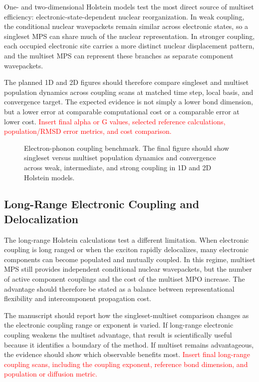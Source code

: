 \documentclass[journal=jctcce,manuscript=article]{achemso}
\newcommand{\placeholder}[1]{\textcolor{red}{#1}}
\newcommand{\figureplaceholder}[2]{%
\begin{figure}[htbp]
    \centering
    \fbox{%
    \begin{minipage}[c][0.24\textheight][c]{0.82\textwidth}
        \centering
        \textbf{Figure dummy: #1}\\[0.5em]
        \placeholder{#2}
    \end{minipage}}
    \caption{#2}
    \label{fig:#1}
\end{figure}}
\begin{document}
One- and two-dimensional Holstein models test the most direct source of multiset efficiency: electronic-state-dependent nuclear reorganization. In weak coupling, the conditional nuclear wavepackets remain similar across electronic states, so a singleset MPS can share much of the nuclear representation. In stronger coupling, each occupied electronic site carries a more distinct nuclear displacement pattern, and the multiset MPS can represent these branches as separate component wavepackets.

The planned 1D and 2D figures should therefore compare singleset and multiset population dynamics across coupling scans at matched time step, local basis, and convergence target. The expected evidence is not simply a lower bond dimension, but a lower error at comparable computational cost or a comparable error at lower cost. \placeholder{Insert final alpha or G values, selected reference calculations, population/RMSD error metrics, and cost comparison.}

\figureplaceholder{holstein-coupling}{Electron-phonon coupling benchmark. The final figure should show singleset versus multiset population dynamics and convergence across weak, intermediate, and strong coupling in 1D and 2D Holstein models.}

\subsection{Long-Range Electronic Coupling and Delocalization}

The long-range Holstein calculations test a different limitation. When electronic coupling is long ranged or when the exciton rapidly delocalizes, many electronic components can become populated and mutually coupled. In this regime, multiset MPS still provides independent conditional nuclear wavepackets, but the number of active component couplings and the cost of the multiset MPO increase. The advantage should therefore be stated as a balance between representational flexibility and intercomponent propagation cost.

The manuscript should report how the singleset-multiset comparison changes as the electronic coupling range or exponent is varied. If long-range electronic coupling weakens the multiset advantage, that result is scientifically useful because it identifies a boundary of the method. If multiset remains advantageous, the evidence should show which observable benefits most. \placeholder{Insert final long-range coupling scans, including the coupling exponent, reference bond dimension, and population or diffusion metric.}
\end{document}
